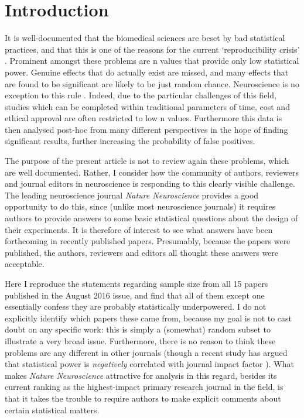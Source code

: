 \documentclass[a4paper,11pt]{article}
\begin{document}
\section*{Introduction}

It is well-documented that the biomedical sciences are beset by bad
statistical practices, and that this is one of the reasons for the
current `reproducibility crisis' \cite{ioannidis05,colquhoun14}.
Prominent amongst these problems are n values that provide only
low statistical power. Genuine effects that do actually exist are
missed, and many effects that are found to be significant are likely
to be just random chance. Neuroscience is no exception to this rule
\cite{button13}. Indeed, due to the particular challenges of this
field, studies which can be completed within traditional parameters of
time, cost and ethical approval are often restricted to low n values.
Furthermore this data is then analysed post-hoc from many different
perspectives in the hope of finding significant results, further
increasing the probability of false positives.

The purpose of the present article is not to review again these
problems, which are well documented. Rather, I consider how the
community of authors, reviewers and journal editors in neuroscience is
responding to this clearly visible challenge. The leading neuroscience
journal {\em Nature Neuroscience} provides a good opportunity to do
this, since (unlike most neuroscience journals) it requires authors to
provide answers to some basic statistical questions about
the design of their experiments. It is therefore of interest to see
what answers have been forthcoming in recently published
papers. Presumably, because the papers were published, the authors,
reviewers and editors all thought these answers were acceptable. 

Here I reproduce the statements regarding sample size from all 15
papers published in the August 2016 issue, and find that all of them
except one essentially confess they are probably statistically
underpowered. I do not explicitly identify which papers these came
from, because my goal is not to cast doubt on any specific work: this
is simply a (somewhat) random subset to illustrate a very broad
issue. Furthermore, there is no reason to think these problems are any
different in other journals (though a recent study has argued that
statistical power is {\em negatively} correlated with journal impact
factor \cite{szucs16}).  What makes {\em Nature Neuroscience}
attractive for analysis in this regard, besides its current ranking as
the highest-impact primary research journal in the field, is that it
takes the trouble to require authors to make explicit comments about
certain statistical matters.
\end{document}
